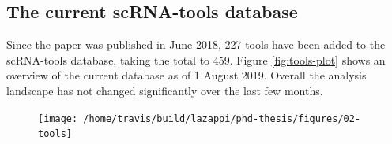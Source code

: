 \documentclass[11pt,a4paper,titlepage,twoside,openright]{style/unimelbthesis}
\theoremstyle{definition}
\theoremstyle{definition}
\theoremstyle{definition}
\theoremstyle{remark}
\begin{document}
\begin{mainmatter}
\clearpage

\hypertarget{tools-current}{%
\section{The current scRNA-tools database}\label{tools-current}}

Since the paper was published in June 2018, 227 tools have been added to the scRNA-tools database, taking the total to 459. Figure \ref{fig:tools-plot} shows an overview of the current database as of 1 August 2019. Overall the analysis landscape has not changed significantly over the last few months.

\begin{figure}

{\centering \texttt{[image: /home/travis/build/lazappi/phd-thesis/figures/02-tools]} 

}
\end{figure}
\end{mainmatter}
\end{document}
